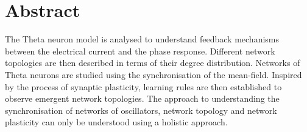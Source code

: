 



\mainmatter


\tableofcontents

\section*{Abstract}
The Theta neuron model is analysed to understand feedback mechanisms between the electrical current and the phase response. Different network topologies are then described in terms of their degree distribution. Networks of Theta neurons are studied using the synchronisation of the mean-field. Inspired by the process of synaptic plasticity, learning rules are then established to observe emergent network topologies. The approach to understanding the synchronisation of networks of oscillators, network topology and network plasticity can only be understood using a holistic approach.

%





\renewcommand{\thepage}{\arabic{page}}









\newpage

\small{}



\label{LastPage}~


